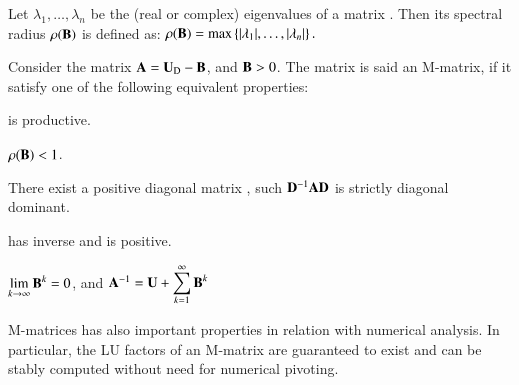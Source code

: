 \documentclass{ecos2018}
\begin{document}
Let $\lambda _{1},\dotsc ,\lambda _{n}$ be the (real or complex) eigenvalues of a matrix . Then its spectral radius $\rho(\mathbf{B})$ is defined as:
\(\displaystyle \rho (\mathbf{B})=\max \left\{|\lambda _{1}|,\dotsc ,|\lambda _{n}|\right\}.\)

Consider the matrix $\mathbf{A}=\mathbf{U}_\mathrm{D}-\mathbf{B}$, and $\mathbf{B}>0$. The matrix  is said an M-matrix, if it satisfy one of the following equivalent properties:
\begin{compactenum}[(i)]
	\item {} is productive.
	\item $\rho(\mathbf{B})<1$.
	\item There exist a positive diagonal matrix , such $\mathbf{D}^{-1}\mathbf{A}\mathbf{D}$ is strictly diagonal dominant.
	\item {} has inverse and  is positive.
	\item $\displaystyle{\lim_{k\rightarrow\infty}\ensuremath{\mathbf{B}}^k=0}$, and 
	$\mathbf{A}^{-1}=\mathbf{U}+\displaystyle{\sum_{k=1}^{\infty}{\ensuremath{\mathbf{B}}^{k}}}$	
\end{compactenum}	
M-matrices has also important properties in relation with numerical analysis. In particular, the LU factors of an M-matrix are guaranteed to exist and can be stably computed
without need for numerical pivoting.
\end{document}
